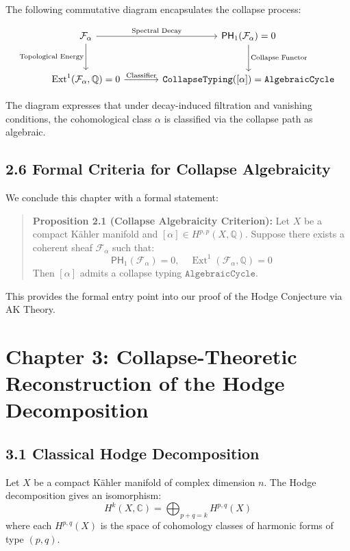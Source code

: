 \documentclass[11pt]{article}
\DeclareMathOperator{\Ext}{Ext}
\begin{document}
The following commutative diagram encapsulates the collapse process:

\[
\begin{tikzcd}[row sep=large, column sep=large]
\mathcal{F}_\alpha \arrow[r, "\text{Spectral Decay}"] \arrow[d, swap, "\text{Topological Energy}"]
& \mathsf{PH}_1(\mathcal{F}_\alpha) = 0 \arrow[d, "\text{Collapse Functor}"] \\
\mathrm{Ext}^1(\mathcal{F}_\alpha, \mathbb{Q}) = 0 \arrow[r, "\text{Classifier}"]
& \texttt{CollapseTyping}([\alpha]) = \texttt{AlgebraicCycle}
\end{tikzcd}
\]

The diagram expresses that under decay-induced filtration and vanishing conditions,  
the cohomological class $\alpha$ is classified via the collapse path as algebraic.

\subsection{2.6 Formal Criteria for Collapse Algebraicity}

We conclude this chapter with a formal statement:

\begin{quote}
\textbf{Proposition 2.1 (Collapse Algebraicity Criterion):}  
Let $X$ be a compact Kähler manifold and $[\alpha] \in H^{p,p}(X, \mathbb{Q})$.  
Suppose there exists a coherent sheaf $\mathcal{F}_\alpha$ such that:
\[
\mathsf{PH}_1(\mathcal{F}_\alpha) = 0, \quad \Ext^1(\mathcal{F}_\alpha, \mathbb{Q}) = 0
\]
Then $[\alpha]$ admits a collapse typing $\texttt{AlgebraicCycle}$.
\end{quote}

This provides the formal entry point into our proof of the Hodge Conjecture via AK Theory.



\section{Chapter 3: Collapse-Theoretic Reconstruction of the Hodge Decomposition}

\subsection{3.1 Classical Hodge Decomposition}

Let $X$ be a compact Kähler manifold of complex dimension $n$.  
The Hodge decomposition gives an isomorphism:
\[
H^k(X, \mathbb{C}) = \bigoplus_{p+q=k} H^{p,q}(X)
\]
where each $H^{p,q}(X)$ is the space of cohomology classes of harmonic forms of type $(p,q)$.
\end{document}
